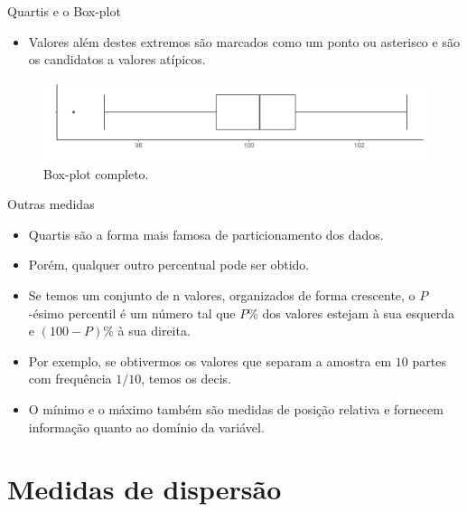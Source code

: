 \documentclass[
  ignorenonframetext,
  serif,
  professionalfont,
  usenames,
  dvipsnames,
  aspectratio = 169]{beamer}
\providecommand{\tightlist}{%
  \setlength{\itemsep}{0pt}\setlength{\parskip}{0pt}}
\renewcommand{\tightlist}{%
  \setlength{\itemsep}{0\baselineskip}
  \setlength{\parskip}{0.25\baselineskip}
}
\begin{document}
\begin{frame}{Quartis e o Box-plot}
\protect\hypertarget{quartis-e-o-box-plot-4}{}
\begin{itemize}
\tightlist
\item
  Valores além destes extremos são marcados como um ponto ou asterisco e
  são os candidatos a valores atípicos.
\end{itemize}

\begin{figure}

{\centering \includegraphics[width=0.9\linewidth]{./img/boxplot0} 

}

\caption{Box-plot completo.}\label{fig:unnamed-chunk-12}
\end{figure}
\end{frame}

\begin{frame}{Outras medidas}
\protect\hypertarget{outras-medidas}{}
\begin{itemize}
\item
  Quartis são a forma mais famosa de particionamento dos dados.
\item
  Porém, qualquer outro percentual pode ser obtido.
\item
  Se temos um conjunto de n valores, organizados de forma crescente, o
  \(P\)-ésimo percentil é um número tal que \(P\%\) dos valores estejam
  à sua esquerda e \((100 - P)\%\) à sua direita.
\item
  Por exemplo, se obtivermos os valores que separam a amostra em \(10\)
  partes com frequência \(1/10\), temos os decis.
\item
  O mínimo e o máximo também são medidas de posição relativa e fornecem
  informação quanto ao domínio da variável.
\end{itemize}
\end{frame}

\hypertarget{medidas-de-dispersuxe3o}{%
\section{Medidas de dispersão}\label{medidas-de-dispersuxe3o}}
\end{document}
